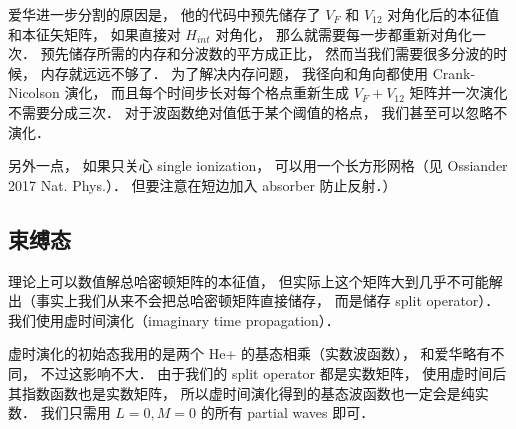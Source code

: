 爱华进一步分割的原因是， 他的代码中预先储存了 $V_F$ 和 $V_{12}$ 对角化后的本征值和本征矢矩阵， 如果直接对 $H_{int}$ 对角化， 那么就需要每一步都重新对角化一次． 预先储存所需的内存和分波数的平方成正比， 然而当我们需要很多分波的时候， 内存就远远不够了． 为了解决内存问题， 我径向和角向都使用 Crank-Nicolson 演化， 而且每个时间步长对每个格点重新生成 $V_F + V_{12}$ 矩阵并一次演化不需要分成三次． 对于波函数绝对值低于某个阈值的格点， 我们甚至可以忽略不演化．

另外一点， 如果只关心 single ionization， 可以用一个长方形网格（见 Ossiander 2017 Nat. Phys.）． 但要注意在短边加入 absorber 防止反射．）

\subsection{束缚态}
理论上可以数值解总哈密顿矩阵的本征值， 但实际上这个矩阵大到几乎不可能解出（事实上我们从来不会把总哈密顿矩阵直接储存， 而是储存 split operator）． 我们使用虚时间演化（imaginary time propagation）．

虚时演化的初始态我用的是两个 He+ 的基态相乘（实数波函数）， 和爱华略有不同， 不过这影响不大． 由于我们的 split operator 都是实数矩阵， 使用虚时间后其指数函数也是实数矩阵， 所以虚时间演化得到的基态波函数也一定会是纯实数．
我们只需用 $L = 0, M = 0$ 的所有 partial waves 即可．
